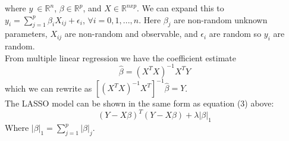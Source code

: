 \documentclass[12pt,twoside]{article}
\begin{document}
where $y\ \in \mathbb{R}^n$, $\beta \in \mathbb{R}^p$, and $X \in \mathbb{R}^{n x p}$. We can expand this to $y_i = \sum_{j = 1}^{p}\beta_iX_{ij} + \epsilon_i$, $\forall i = 0,1,...,n$. Here $\beta_j$ are non-random unknown parameters, $X_{ij}$ are non-random and observable, and $\epsilon_i$ are random so $y_i$ are random.\\From multiple linear regression we have the coefficient estimate 
\begin{equation}
\label{eq:betacoef}
\hat{\beta} = (X^TX)^{-1}X^TY
\end{equation}
which we can rewrite as $[(X^TX)^{-1}X^T]^{-1}\hat{\beta} = Y$.\\The LASSO model can be shown in the same form as equation (3) above:
\begin{equation}
\label{eq:LASSO OLS}
(Y-X\beta)^T(Y-X\beta) + \lambda|\beta|_1
\end{equation}
Where $|\beta|_1 = \sum\limits_{j=1}^{p}|\beta|_j$. 

        
\end{document}
